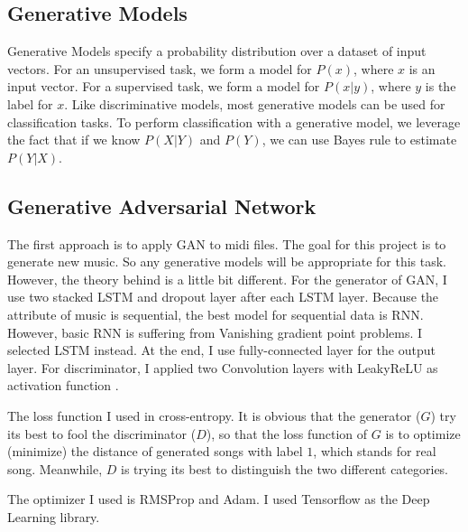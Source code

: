 \documentclass[journal, a4paper]{IEEEtran}
\begin{document}
\subsection{Generative Models}
Generative Models specify a probability distribution over a dataset of input vectors. For an unsupervised task, we form a model for $P(x)$, where $x$ is an input vector. For a supervised task, we form a model for $P(x|y)$, where $y$ is the label for $x$. Like discriminative models, most generative models can be used for classification tasks. To perform classification with a generative model, we leverage the fact that if we know $P(X|Y)$ and $P(Y)$, we can use Bayes rule to estimate $P(Y|X)$.

\subsection{Generative Adversarial Network}
	The first approach is to apply GAN to midi files. The goal for this project is to generate new music. So any generative models will be appropriate for this task. However, the theory behind is a little bit different. For the generator of GAN, I use two stacked LSTM and dropout layer after each LSTM layer. Because the attribute of music is sequential, the best model for sequential data is RNN. However, basic RNN is suffering from Vanishing gradient point problems. I selected LSTM instead. At the end, I use fully-connected layer for the output layer. For discriminator, I applied two Convolution layers with LeakyReLU as activation function .

    The loss function I used in cross-entropy. It is obvious that the generator ($G$) try its best to fool the discriminator ($D$), so that the loss function of $G$ is to optimize (minimize) the distance of generated songs with label $1$, which stands for real song. Meanwhile, $D$ is trying its best to distinguish the two different categories.

    The optimizer I used is RMSProp and Adam. I used Tensorflow as the Deep Learning library.\\
\end{document}
